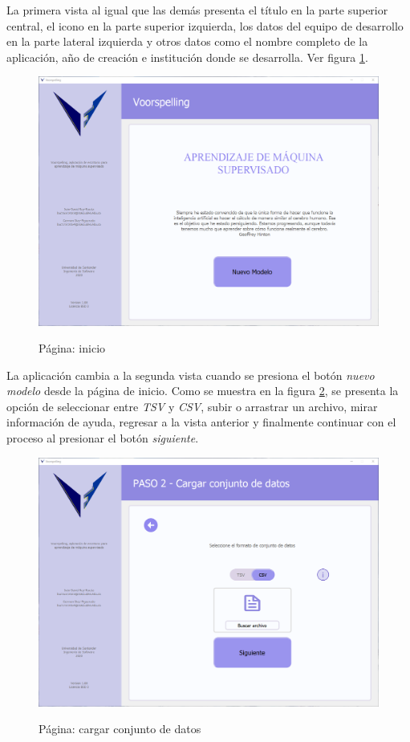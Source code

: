 La primera vista al igual que las demás presenta el título en la parte superior central, el icono en la parte superior izquierda, los datos del equipo de desarrollo en la parte lateral izquierda y otros datos como el nombre completo de la aplicación, año de creación e institución donde se desarrolla. Ver figura \ref{fig:home}.

\begin{figure}[H]
    \centering
    \caption{Página: inicio}
    \includegraphics[width=\textwidth]{views/home.png}
    \label{fig:home}
\end{figure}

La aplicación cambia a la segunda vista cuando se presiona el botón \textit{nuevo modelo} desde la página de inicio. Como se muestra en la figura \ref{fig:loaddataset}, se presenta la opción de seleccionar entre \textit{TSV} y \textit{CSV}, subir o arrastrar un archivo, mirar información de ayuda, regresar a la vista anterior y finalmente continuar con el proceso al presionar el botón \textit{siguiente}.

\begin{figure}[H]
    \centering
    \caption{Página: cargar conjunto de datos}
    \includegraphics[width=\textwidth]{views/load_dataset.png}
    \label{fig:loaddataset}
\end{figure}

